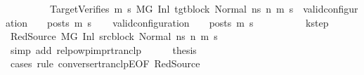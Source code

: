 \begin{isabellebody}
\ \ \ \ \ \ \ \ \ TargetVerifies{\isacharcolon}{\kern0pt}\ {\isachardoublequoteopen}{\isasymforall}m{}{\isacharprime}{\kern0pt}\ s{}{\isacharprime}{\kern0pt}{\isachardot}{\kern0pt}{\isacharparenleft}{\kern0pt}\ M{\isacharcomma}{\kern0pt}{\isasymLambda}{\isacharcomma}{\kern0pt}{\isasymGamma}{\isacharcomma}{\kern0pt}{\isasymOmega}{\isacharcomma}{\kern0pt}G{\isacharprime}{\kern0pt}\ {\isasymturnstile}{\isacharparenleft}{\kern0pt}Inl\ tgt{\isacharunderscore}{\kern0pt}block{\isacharcomma}{\kern0pt}\ Normal\ ns{\isacharparenright}{\kern0pt}\ {\isacharminus}{\kern0pt}n{\isasymrightarrow}{\isacharasterisk}{\kern0pt}\ {\isacharparenleft}{\kern0pt}m{}{\isacharprime}{\kern0pt}{\isacharcomma}{\kern0pt}\ s{}{\isacharprime}{\kern0pt}{\isacharparenright}{\kern0pt}{\isacharparenright}{\kern0pt}\ {\isasymlongrightarrow}\ valid{\isacharunderscore}{\kern0pt}configuration\ {\isasymLambda}\ {\isasymGamma}\ {\isasymOmega}\ posts\ m{}{\isacharprime}{\kern0pt}\ s{}{\isacharprime}{\kern0pt}{\isachardoublequoteclose}\isanewline
\ \ \isamarkupfalse%
\ {\isachardoublequoteopen}valid{\isacharunderscore}{\kern0pt}configuration\ {\isasymLambda}\ {\isasymGamma}\ {\isasymOmega}\ posts\ m{\isacharprime}{\kern0pt}\ s{\isacharprime}{\kern0pt}{\isachardoublequoteclose}\isanewline
\ \ \isamarkupfalse%
\ {\isacharminus}{\kern0pt}\isanewline
\ \ \ \ \isamarkupfalse%
\ k{\isacharunderscore}{\kern0pt}step\ \isamarkupfalse%
\ RedSource{\isacharcolon}{\kern0pt}\ {\isachardoublequoteopen}M{\isacharcomma}{\kern0pt}{\isasymLambda}{\isacharcomma}{\kern0pt}{\isasymGamma}{\isacharcomma}{\kern0pt}{\isasymOmega}{\isacharcomma}{\kern0pt}G\ {\isasymturnstile}{\isacharparenleft}{\kern0pt}Inl\ src{\isacharunderscore}{\kern0pt}block{\isacharcomma}{\kern0pt}\ Normal\ ns{\isacharparenright}{\kern0pt}\ {\isacharminus}{\kern0pt}n{\isasymrightarrow}{\isacharasterisk}{\kern0pt}\ {\isacharparenleft}{\kern0pt}m{\isacharprime}{\kern0pt}{\isacharcomma}{\kern0pt}\ s{\isacharprime}{\kern0pt}{\isacharparenright}{\kern0pt}{\isachardoublequoteclose}\isanewline
\ \ \ \ \ \ \isamarkupfalse%
\ {\isacharparenleft}{\kern0pt}simp\ add{\isacharcolon}{\kern0pt}\ relpowp{\isacharunderscore}{\kern0pt}imp{\isacharunderscore}{\kern0pt}rtranclp{\isacharparenright}{\kern0pt}\isanewline
\ \ \ \ \isamarkupfalse%
\ {\isacharquery}{\kern0pt}thesis\isanewline
\ \ \ \ \isamarkupfalse%
\ {\isacharparenleft}{\kern0pt}cases\ rule{\isacharcolon}{\kern0pt}\ converse{\isacharunderscore}{\kern0pt}rtranclpE{}{\isacharbrackleft}{\kern0pt}OF\ RedSource{\isacharbrackright}{\kern0pt}{\isacharparenright}{\kern0pt}\isanewline

\end{isabellebody}
